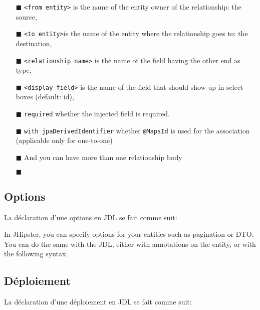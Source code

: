 \begin{itemize}
\item[$\blacksquare$]
  \texttt{\textless{}from\ entity\textgreater{}} is the name of the
  entity owner of the relationship: the source,
\item[$\blacksquare$]
  \texttt{\textless{}to\ entity\textgreater{}}is the name of the entity
  where the relationship goes to: the destination,
\item[$\blacksquare$]
  \texttt{\textless{}relationship\ name\textgreater{}} is the name of
  the field having the other end as type,
\item[$\blacksquare$]
  \texttt{\textless{}display\ field\textgreater{}} is the name of the
  field that should show up in select boxes (default: id),
\item[$\blacksquare$]
  \texttt{required} whether the injected field is required.
\item[$\blacksquare$]
  \texttt{with\ jpaDerivedIdentifier} whether \texttt{@MapsId} is used
  for the association (applicable only for one-to-one)
\item[$\blacksquare$]
  And you can have more than one relationship body
\item[$\blacksquare$]
\end{itemize}

\subsection{Options}

La déclaration d'une options en JDL se fait comme suit:

In JHipster, you can specify options for your entities such as
pagination or DTO. You can do the same with the JDL, either with
annotations on the entity, or with the following syntax.

\subsection{Déploiement}

La déclaration d'une déploiement en JDL se fait comme suit:

\begin{Shaded}
\begin{Highlighting}[]
\NormalTok{\}}
\end{Highlighting}
\end{Shaded}

